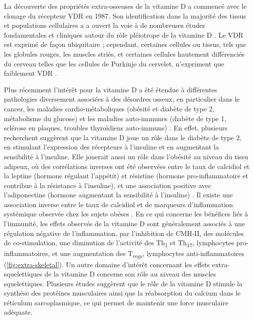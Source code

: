\documentclass[
  a4paper,
  DIV=11,
  numbers=noendperiod,
  listof=totoc]{scrreprt}
\begin{document}
La découverte des propriétés extra-osseuses de la vitamine D a commencé
avec le clonage du récepteur \ac{VDR} en 1987. Son identification dans
la majorité des tissus et populations cellulaires a a ouvert la voie à
de nombreuses études fondamentales et cliniques autour du rôle
pléiotrope de la vitamine D \autocite{Rosen.2012}. Le \ac{VDR} est
exprimé de façon ubiquitaire ; cependant, certaines cellules ou tissus,
tels que les globules rouges, les muscles striés, et certaines cellules
hautement différenciés du cerveau telles que les cellules de Purkinje du
cervelet, n'expriment que faiblement \ac{VDR} \autocite{Bouillon.2008}.

Plus récemment l'intérêt pour la vitamine D a été étendue à différentes
pathologies diversement associées à des désordres osseux, en particulier
dans le cancer, les maladies cardio-métaboliques (obésité et diabète de
type 2, métabolisme du glucose) et les maladies auto-immunes (diabète de
type 1, sclérose en plaques, troubles thyroïdiens auto-immuns)
\autocite{Dankers.2017,Caprio.2017}. En effet, plusieurs recherchent
suggèrent que la vitamine D joue un rôle dans le diabète de type 2, en
stimulant l'expression des récepteurs à l'insuline et en augmentant la
sensibilité à l'insuline. Elle jouerait aussi un rôle dans l'obésité au
niveau du tissu adipeux, où des corrélations inverses ont été observées
entre le taux de calcidiol et la leptine (hormone régulant l'appétit) et
résistine (hormone pro-inflammatoire et contribue à la résistance à
l'insuline), et une association positive avec l'adiponectine (hormone
augmentant la sensibilité à l'insuline)
\autocite{Caprio.2017,Bellia.2013}. Il existe une association inverse
entre le taux de calcidiol et de marqueurs d'inflammation systémique
observée chez les sujets obèses \autocite{Bellia.2013}. En ce qui
concerne les bénéfices liés à l'immunité, les effets observés de la
vitamine D sont généralement associés à une régulation négative de
l'inflammation, par l'inhibition de \ac{CMH-II}, des molécules de
co-stimulation, une diminution de l'activité des Th\textsubscript{1} et
Th\textsubscript{17}, lymphocytes pro-inflammatoires, et une
augmentation des T\textsubscript{regs}, lymphocytes anti-inflammatoires
(\cref{fig:extra-skeletal}). Un autre domaine d'intérêt concernant les
effets extra-squelettiques de la vitamine D concerne son rôle au niveau
des muscles squelettiques. Plusieurs études suggèrent que le rôle de la
vitamine D stimule la synthèse des protéines musculaires ainsi que la
réabsorption du calcium dans le réticulum sarcoplasmique, ce qui permet
de maintenir une force musculaire adéquate.
\end{document}
